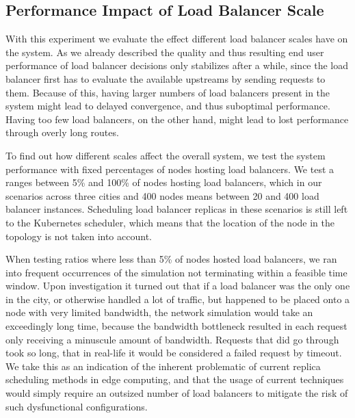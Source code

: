 \subsection{Performance Impact of Load Balancer Scale}
With this experiment we evaluate the effect different load balancer scales have on the system.
As we already described the quality and thus resulting end user performance of load balancer decisions only stabilizes after a while, since the load balancer first has to evaluate the available upstreams by sending requests to them.
Because of this, having larger numbers of load balancers present in the system might lead to delayed convergence, and thus suboptimal performance.
Having too few load balancers, on the other hand, might lead to lost performance through overly long routes.

To find out how different scales affect the overall system, we test the system performance with fixed percentages of nodes hosting load balancers.
We test a ranges between 5\% and 100\% of nodes hosting load balancers, which in our scenarios across three cities and 400 nodes means between 20 and 400 load balancer instances.
Scheduling load balancer replicas in these scenarios is still left to the Kubernetes scheduler, which means that the location of the node in the topology is not taken into account.

When testing ratios where less than 5\% of nodes hosted load balancers, we ran into frequent occurrences of the simulation not terminating within a feasible time window.
Upon investigation it turned out that if a load balancer was the only one in the city, or otherwise handled a lot of traffic, but happened to be placed onto a node with very limited bandwidth, the network simulation would take an exceedingly long time, because the bandwidth bottleneck resulted in each request only receiving a minuscule amount of bandwidth.
Requests that did go through took so long, that in real-life it would be considered a failed request by timeout.
We take this as an indication of the inherent problematic of current replica scheduling methods in edge computing, and that the usage of current techniques would simply require an outsized number of load balancers to mitigate the risk of such dysfunctional configurations.

